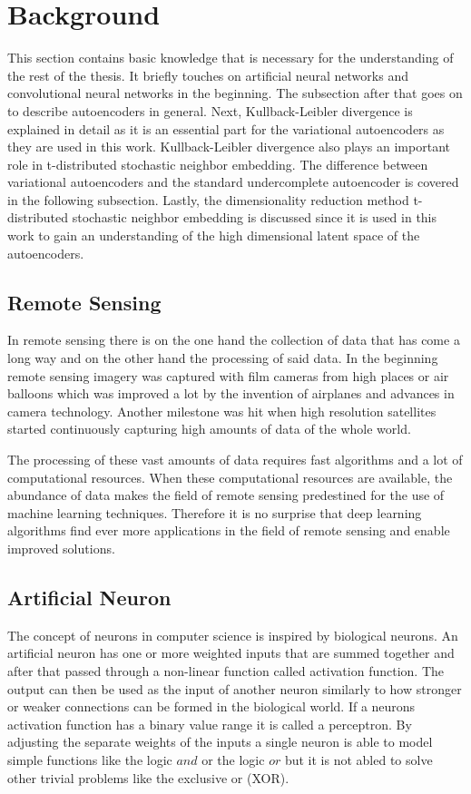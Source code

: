 \section{Background}

This section contains basic knowledge that is necessary for the understanding of the rest of the thesis.
It briefly touches on artificial neural networks and convolutional neural networks in the beginning.
The subsection after that goes on to describe autoencoders in general. Next, Kullback-Leibler divergence
is explained in detail as it is an essential part for the variational autoencoders as they are used in this
work. Kullback-Leibler divergence also plays an important role in t-distributed stochastic neighbor embedding.
The difference between variational autoencoders and the standard undercomplete autoencoder is covered in the 
following subsection. Lastly, the dimensionality reduction method 
t-distributed stochastic neighbor embedding is discussed since it is used in this work to gain an 
understanding of the high dimensional latent space of the autoencoders.

\subsection{Remote Sensing}

In remote sensing there is on the one hand the collection of data that has come a long way and on the other hand
the processing of said data. In the beginning remote sensing imagery was captured with film cameras from
high places or air balloons which was improved a lot by the invention of airplanes and advances in camera
technology. Another milestone was hit when high resolution satellites started continuously capturing 
high amounts of data of the whole world.

The processing of these vast amounts of data requires fast algorithms and a lot of computational resources.
When these computational resources are available, the abundance of data makes the field of remote sensing
predestined for the use of machine learning techniques. Therefore it is no surprise that deep learning
algorithms find ever more applications in the field of remote sensing and enable improved solutions.

\subsection{Artificial Neuron}

The concept of neurons in computer science is inspired by biological neurons. An artificial neuron has one or
more weighted inputs that are summed together
and after that passed through a non-linear function called activation function. 
The output can then be used as
the input of another neuron similarly to how stronger or weaker connections can be formed in the biological
world.
If a neurons activation function has a binary value range it is called a perceptron.
By adjusting the separate weights of the inputs a single neuron is able to model
simple functions like the logic $and$ or the logic $or$ but it is not abled to solve other trivial problems
like the exclusive or (XOR).

